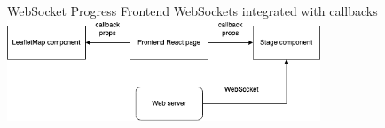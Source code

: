 




\begin{frame}{WebSocket Progress}
    Frontend WebSockets integrated with callbacks
    \includegraphics[height=0.7\textheight,width=0.7\textwidth,keepaspectratio]{mm_1-24_callbacks.png}
\end{frame}

